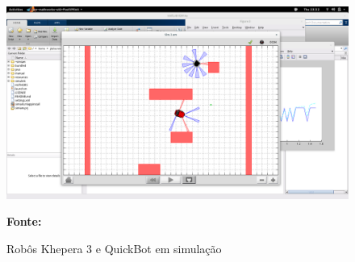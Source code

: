 \begin{figure}[ht]
\centering
\caption{Robôs Khepera 3 e QuickBot em simulação}
\label{fig:RobosEmSimulador}
		\centering
		\includegraphics[trim={0cm 0cm 0cm 0cm},clip,
scale=0.24]{Figuras/simiam-screenshot}
	
	\textbf{Fonte: }
\end{figure}